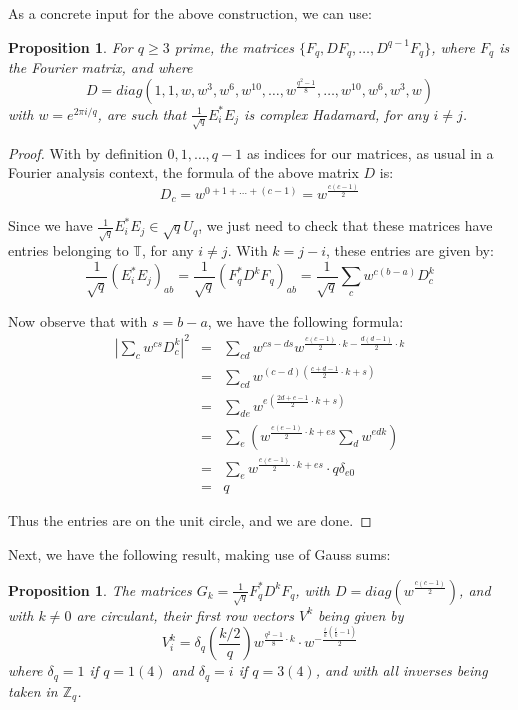 \documentclass[12pt]{amsbook}
\newtheorem{proposition}[theorem]{Proposition}
\begin{document}
As a concrete input for the above construction, we can use:

\begin{proposition}
For $q\geq3$ prime, the matrices $\{F_q,DF_q,\ldots,D^{q-1}F_q\}$, where $F_q$ is the Fourier matrix, and where
$$D=diag\left(1,1,w,w^3,w^6,w^{10},\ldots,w^{\frac{q^2-1}{8}},\ldots,w^{10},w^6,w^3,w\right)$$
with $w=e^{2\pi i/q}$, are such that $\frac{1}{\sqrt{q}}E_i^*E_j$ is complex Hadamard, for any $i\neq j$.
\end{proposition}

\begin{proof}
With by definition $0,1,\ldots,q-1$ as indices for our matrices, as usual in a Fourier analysis context, the formula of the above matrix $D$ is:
$$D_c
=w^{0+1+\ldots+(c-1)}
=w^{\frac{c(c-1)}{2}}$$

Since we have $\frac{1}{\sqrt{q}}E_i^*E_j\in\sqrt{q}U_q$, we just need to check that these matrices have entries belonging to $\mathbb T$, for any $i\neq j$. With $k=j-i$, these entries are given by:
$$\frac{1}{\sqrt{q}}(E_i^*E_j)_{ab}
=\frac{1}{\sqrt{q}}(F_q^*D^kF_q)_{ab}
=\frac{1}{\sqrt{q}}\sum_cw^{c(b-a)}D_c^k$$

Now observe that with $s=b-a$, we have the following formula:
\begin{eqnarray*}
\left|\sum_cw^{cs}D_c^k\right|^2
&=&\sum_{cd}w^{cs-ds}w^{\frac{c(c-1)}{2}\cdot k-\frac{d(d-1)}{2}\cdot k}\\
&=&\sum_{cd}w^{(c-d)\left(\frac{c+d-1}{2}\cdot k+s\right)}\\
&=&\sum_{de}w^{e\left(\frac{2d+e-1}{2}\cdot k+s\right)}\\
&=&\sum_e\left(w^{\frac{e(e-1)}{2}\cdot k+es}\sum_dw^{edk}\right)\\
&=&\sum_ew^{\frac{e(e-1)}{2}\cdot k+es}\cdot q\delta_{e0}\\
&=&q
\end{eqnarray*}

Thus the entries are on the unit circle, and we are done.
\end{proof}

Next, we have the following result, making use of Gauss sums:

\begin{proposition}
The matrices $G_k=\frac{1}{\sqrt{q}}F_q^*D^kF_q$, with $D=diag\left(w^{\frac{c(c-1)}{2}}\right)$, and with $k\neq0$ are circulant, their first row vectors $V^k$ being given by
$$V^k_i=\delta_q\left(\frac{k/2}{q}\right)w^{\frac{q^2-1}{8}\cdot k}\cdot w^{-\frac{\frac{i}{k}(\frac{i}{k}-1)}{2}}$$
where $\delta_q=1$ if $q=1(4)$ and $\delta_q=i$ if $q=3(4)$, and with all inverses being taken in $\mathbb Z_q$.
\end{proposition}
\end{document}
